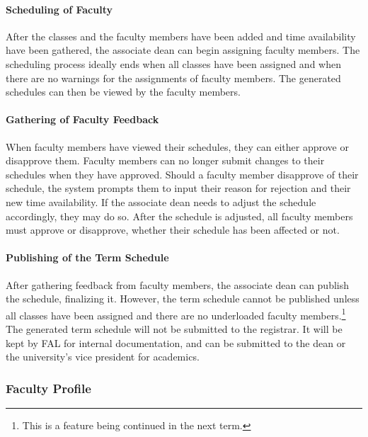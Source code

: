         \paragraph{Scheduling of Faculty}
        After the classes and the faculty members have been added and time availability have been gathered, the associate dean can begin assigning faculty members. The scheduling process ideally ends when all classes have been assigned and when there are no warnings for the assignments of faculty members. The generated schedules can then be viewed by the faculty members.
        
        \paragraph{Gathering of Faculty Feedback}
        When faculty members have viewed their schedules, they can either approve or disapprove them. Faculty members can no longer submit changes to their schedules when they have approved. Should a faculty member disapprove of their schedule, the system prompts them to input their reason for rejection and their new time availability. If the associate dean needs to adjust the schedule accordingly, they may do so. After the schedule is adjusted, all faculty members must approve or disapprove, whether their schedule has been affected or not.
        
        \paragraph{Publishing of the Term Schedule}
        After gathering feedback from faculty members, the associate dean can publish the schedule, finalizing it. However, the term schedule cannot be published unless all classes have been assigned and there are no underloaded faculty members.\footnote{This is a feature being continued in the next term.} The generated term schedule will not be submitted to the registrar. It will be kept by FAL for internal documentation, and can be submitted to the dean or the university's vice president for academics.

    \subsubsection{Faculty Profile}
